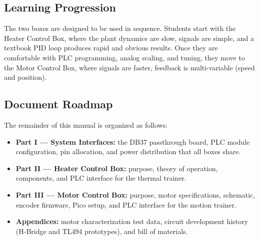 \documentclass[main.tex]{subfiles}
\begin{document}
\subsection{Learning Progression}

The two boxes are designed to be used in sequence. Students start with the Heater Control Box, where the plant dynamics are slow, signals are simple, and a textbook PID loop produces rapid and obvious results. Once they are comfortable with PLC programming, analog scaling, and tuning, they move to the Motor Control Box, where signals are faster, feedback is multi-variable (speed and position).

\subsection{Document Roadmap}

The remainder of this manual is organized as follows:

\begin{itemize}
    \item \textbf{Part I --- System Interfaces:} the DB37 passthrough board, PLC module configuration, pin allocation, and power distribution that all boxes share.
    \item \textbf{Part II --- Heater Control Box:} purpose, theory of operation, components, and PLC interface for the thermal trainer.
    \item \textbf{Part III --- Motor Control Box:} purpose, motor specifications, schematic, encoder firmware, Pico setup, and PLC interface for the motion trainer.
    \item \textbf{Appendices:} motor characterization test data, circuit development history (H-Bridge and TL494 prototypes), and bill of materials.
\end{itemize}
\end{document}
